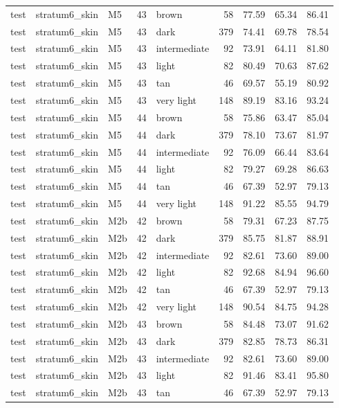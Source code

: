 \begin{tabular}{lllrlrrrr}
test & stratum6\_skin & M5 & 43 & brown & 58 & 77.59 & 65.34 & 86.41 \\
test & stratum6\_skin & M5 & 43 & dark & 379 & 74.41 & 69.78 & 78.54 \\
test & stratum6\_skin & M5 & 43 & intermediate & 92 & 73.91 & 64.11 & 81.80 \\
test & stratum6\_skin & M5 & 43 & light & 82 & 80.49 & 70.63 & 87.62 \\
test & stratum6\_skin & M5 & 43 & tan & 46 & 69.57 & 55.19 & 80.92 \\
test & stratum6\_skin & M5 & 43 & very light & 148 & 89.19 & 83.16 & 93.24 \\
test & stratum6\_skin & M5 & 44 & brown & 58 & 75.86 & 63.47 & 85.04 \\
test & stratum6\_skin & M5 & 44 & dark & 379 & 78.10 & 73.67 & 81.97 \\
test & stratum6\_skin & M5 & 44 & intermediate & 92 & 76.09 & 66.44 & 83.64 \\
test & stratum6\_skin & M5 & 44 & light & 82 & 79.27 & 69.28 & 86.63 \\
test & stratum6\_skin & M5 & 44 & tan & 46 & 67.39 & 52.97 & 79.13 \\
test & stratum6\_skin & M5 & 44 & very light & 148 & 91.22 & 85.55 & 94.79 \\
test & stratum6\_skin & M2b & 42 & brown & 58 & 79.31 & 67.23 & 87.75 \\
test & stratum6\_skin & M2b & 42 & dark & 379 & 85.75 & 81.87 & 88.91 \\
test & stratum6\_skin & M2b & 42 & intermediate & 92 & 82.61 & 73.60 & 89.00 \\
test & stratum6\_skin & M2b & 42 & light & 82 & 92.68 & 84.94 & 96.60 \\
test & stratum6\_skin & M2b & 42 & tan & 46 & 67.39 & 52.97 & 79.13 \\
test & stratum6\_skin & M2b & 42 & very light & 148 & 90.54 & 84.75 & 94.28 \\
test & stratum6\_skin & M2b & 43 & brown & 58 & 84.48 & 73.07 & 91.62 \\
test & stratum6\_skin & M2b & 43 & dark & 379 & 82.85 & 78.73 & 86.31 \\
test & stratum6\_skin & M2b & 43 & intermediate & 92 & 82.61 & 73.60 & 89.00 \\
test & stratum6\_skin & M2b & 43 & light & 82 & 91.46 & 83.41 & 95.80 \\
test & stratum6\_skin & M2b & 43 & tan & 46 & 67.39 & 52.97 & 79.13 \\

\end{tabular}
